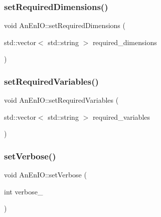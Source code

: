 \mbox{\label{class_an_en_i_o_a239ea94b3648006920bcdcded4040ad3}} 
\subsubsection{\texorpdfstring{set\+Required\+Dimensions()}{setRequiredDimensions()}}
{\footnotesize\ttfamily void An\+En\+I\+O\+::set\+Required\+Dimensions (\begin{DoxyParamCaption}\item[{std\+::vector$<$ std\+::string $>$}]{required\+\_\+dimensions }\end{DoxyParamCaption})}

\mbox{\label{class_an_en_i_o_a643c51c346118d8416fa2c2e0da8042a}} 
\subsubsection{\texorpdfstring{set\+Required\+Variables()}{setRequiredVariables()}}
{\footnotesize\ttfamily void An\+En\+I\+O\+::set\+Required\+Variables (\begin{DoxyParamCaption}\item[{std\+::vector$<$ std\+::string $>$}]{required\+\_\+variables }\end{DoxyParamCaption})}

\mbox{\label{class_an_en_i_o_a696dff7bb250fc45b597e5f82e33e23e}} 
\subsubsection{\texorpdfstring{set\+Verbose()}{setVerbose()}}
{\footnotesize\ttfamily void An\+En\+I\+O\+::set\+Verbose (\begin{DoxyParamCaption}\item[{int}]{verbose\+\_\+ }\end{DoxyParamCaption})}



